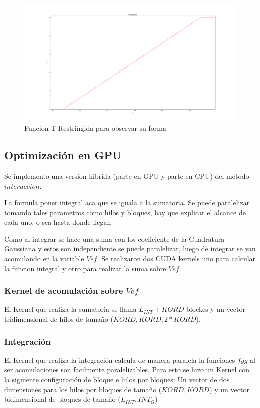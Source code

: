 \documentclass[a4paper,openright,12pt, oneside]{book}
\begin{document}
\begin{figure}[!htbp]
  \begin{center}
    \leavevmode

    \includegraphics[scale=0.3]{funcionT.png}

    \caption{Funcion T Restringida para observar su forma}
    \label{img:funciont}
  \end{center}
\end{figure}

\subsection{Optimizaci\'on en GPU}
Se implemento una version hibrida (parte en GPU y parte en CPU) del m\'etodo $interaccion$. 

La formula {poner integral aca que se iguala a la sumatoria}. Se puede paralelizar {tomando tales parametros como hilos y bloques, hay que explicar el alcance de cada uno. o sea hasta donde llegan}

Como al integrar se hace una suma con los coeficiente de la Cuadratura Gaussiana y estos son independiente se puede paralelizar, luego de integrar se van acomulando en la variable $Vef$. 
Se realizaron dos CUDA kernels uno para calcular la funcion integral y otro para realizar la suma sobre $Vef$.

\subsubsection{Kernel de acomulaci\'on sobre $Vef$}

El Kernel que realiza la sumatoria se llama $L_{INT} + KORD$ blockes y un vector tridimensional de hilos de tama\~no ($KORD, KORD, 2*KORD$).


\subsubsection{Integraci\'on}
El Kernel que realiza la integraci\'on calcula de manera paralela la funciones $f y g$ al ser acomulaciones son facilmente paralelizables. 
Para esto se hizo un Kernel con la siguiente configuraci\'on de bloque e hilos por bloques: Un vector de dos dimensiones para los hilos por bloques de tama\~no ($KORD, KORD$) y un vector bidimensional de bloques de tama\~no ($L_{INT}, INT_{G}$)
\end{document}
